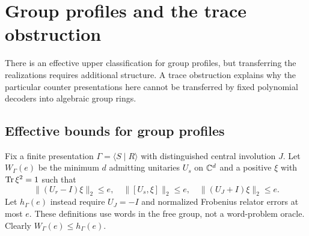 \section{Group profiles and the trace obstruction}\label{sec:group-profiles}
There is an effective upper classification for group profiles, but transferring the realizations requires additional structure. A trace obstruction explains why the particular counter presentations here cannot be transferred by fixed polynomial decoders into algebraic group rings.

\subsection{Effective bounds for group profiles}
Fix a finite presentation $\Gamma=\langle S\mid R\rangle$ with distinguished central involution $J$. Let $W_\Gamma(e)$ be the minimum $d$ admitting unitaries $U_s$ on $\mathbb C^d$ and a positive $\xi$ with $\operatorname{Tr}\xi^2=1$ such that
\[
 \|(U_r-I)\xi\|_2\le e,\quad
 \|[U_s,\xi]\|_2\le e,\quad
 \|(U_J+I)\xi\|_2\le e.
\]
Let $h_\Gamma(e)$ instead require $U_J=-I$ and normalized Frobenius relator errors at most $e$. These definitions use words in the free group, not a word-problem oracle. Clearly $W_\Gamma(e)\le h_\Gamma(e)$.

